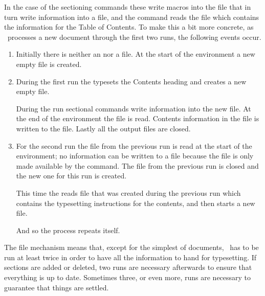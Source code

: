     In the case of the sectioning commands these write macros into the
 file that in turn write information into a 
file, and the \cmd{\tableofcontents} command reads the 
file which contains the information for the Table of Contents. To make this
a bit more concrete, as \ltx\ processes a new document through the
first two runs, the following events occur.
\begin{enumerate}
\item Initially there is neither an  nor a  file.
      At the start of the  environment a new empty 
      file is created.
\item During the first run the \cmd{\tableofcontents} typesets the
      Contents heading and creates a new empty 
      file.

      During
      the run sectional commands write information into the new 
       file. At the end of the  environment
      the  file
      is read. Contents information in the  file is written
      to the  file. Lastly all the output files are closed.

\item For the second run the  file from the previous run is 
      read at the start of the  environment; no information can
      be written to a  file because the  file
      is only made available by the \cmd{\tableofcontents} command.
      The  file from the previous run is closed and the new
      one for this run is created.

        This time the \cmd{\tableofcontents} reads  file
      that was created during the previous run which contains the typesetting
      instructions for the contents, and then starts a
      new  file.

         And so the process repeats itself.
\end{enumerate}

    The  file mechanism means that, except for the simplest 
of documents, \ltx\ has to be run at least
twice in order to have all the information to hand for typesetting. 
If sections are added or deleted, two runs are necessary afterwards 
to ensure that everything is up to date. Sometimes three, or even more, 
runs are necessary to guarantee that things are settled.



